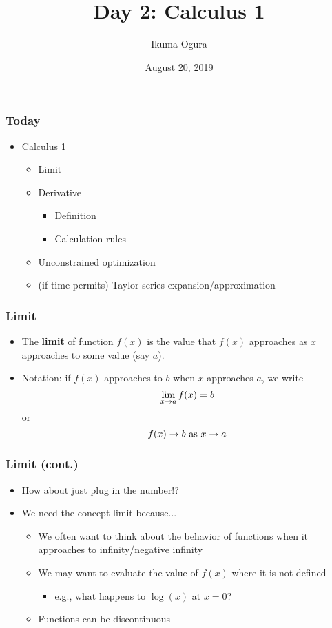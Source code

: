 \documentclass[pdflatex, 12pt]{beamer}
\title[Math Camp: Day 2]{Day 2: Calculus 1}
\author[Ikuma Ogura]{Ikuma Ogura}
\institute[Georgetown]{Ph.D. student, Department of Government, Georgetown University}
\date[August 20, 2019]{August 20, 2019}
\begin{document}
\begin{frame}
\frametitle{}
\titlepage
\end{frame}

\begin{frame}
\frametitle{Today}
\begin{itemize}
\item Calculus 1
 \begin{itemize}
 \item Limit
 \item Derivative
  \begin{itemize}
  \item Definition
  \item Calculation rules
  \end{itemize}
 \item Unconstrained optimization
 \item (if time permits) Taylor series expansion/approximation
 \end{itemize}
\end{itemize}
\end{frame}

\begin{frame}
\frametitle{Limit}
\begin{itemize}
\item The \textbf{limit} of function $f(x)$ is the value that $f(x)$ approaches as $x$ approaches to some value (say $a$).
\vspace{0.4cm}
\item Notation: if $f(x)$ approaches to $b$ when $x$ approaches $a$, we write
 \begin{equation}
 \lim_{x \to a} f(x) = b \notag
 \end{equation}
 or
 \begin{equation}
 f(x) \rightarrow b \ \mathrm{as} \ x \rightarrow a \notag
 \end{equation}
\end{itemize}
\end{frame}

\begin{frame}
\frametitle{Limit (cont.)}
\begin{itemize}
\item How about just plug in the number!?
\vspace{0.4cm}
\item We need the concept limit because...
 \begin{itemize}
 \item We often want to think about the behavior of functions when it approaches to infinity/negative infinity
 \item We may want to evaluate the value of $f(x)$ where it is not defined
  \begin{itemize}
  \item e.g., what happens to $\log(x)$ at $x = 0$?
  \end{itemize}
 \item Functions can be discontinuous 
 \end{itemize}
\end{itemize}
\end{frame}
\end{document}

